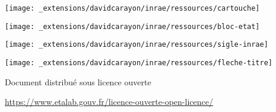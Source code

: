 \makeatletter
\let\inserttitle\@title
\makeatother
\makeatletter
\let\insertauthor\@author
\makeatother
\makeatletter
\let\insertdate\@date
\makeatother


\vspace*{-4.5cm}

%

\vspace*{12.15cm}

\hspace{-2.7cm}
\texttt{[image: \_extensions/davidcarayon/inrae/ressources/cartouche]}\par

\hspace{12cm}
\texttt{[image: \_extensions/davidcarayon/inrae/ressources/bloc-etat]}\par
\vspace*{-2cm}

\hspace{-2.8cm}
\texttt{[image: \_extensions/davidcarayon/inrae/ressources/sigle-inrae]}

\vspace*{1cm}

\hspace{-1cm}
\setlength{\parindent}{0cm}
\texttt{[image: \_extensions/davidcarayon/inrae/ressources/fleche-titre]}\hspace{0.3cm}\textcolor{inrae}{\sffamily\Huge\bfseries \inserttitle}\par\bigskip

\hspace{-1cm}\textcolor{inrae}{\sffamily \insertdate}\par

\hspace{-1cm}\textcolor{inraefonce}{\sffamily \insertauthor}\par

\vspace*{0.25cm}

\hspace{-1.3cm}
\textcolor{inraefonce}{\sffamily
Document distribué sous licence ouverte}\par
\vspace*{-0.3cm}
\hspace{-1.1cm} \href{https://www.etalab.gouv.fr/licence-ouverte-open-licence/}{https://www.etalab.gouv.fr/licence-ouverte-open-licence/}

\restoregeometry

